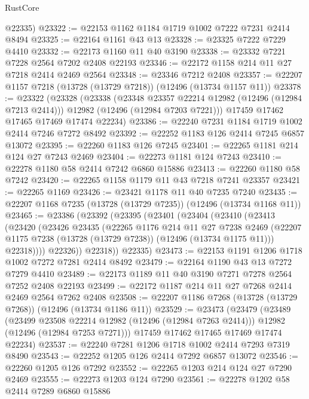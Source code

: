 \begin{lexlean}{RustCore}
\begin{coremodule}
      @22335)
@23322 := @22153 @1162 @1184 @1719 @1002 @7222 @7231 @2414 @8494
@23325 := @22164 @1161 @43 @13
@23328 := @23325 @7222 @7229 @4410
@23332 := @22173 @1160 @11 @40 @3190
@23338 := @23332 @7221 @7228 @2564 @7202 @2408 @22193
@23346 := @22172 @1158 @214 @11 @27 @7218 @2414 @2469 @2564
@23348 := @23346 @7212 @2408
@23357 := @22207 @1157 @7218 (@13728 (@13729 @7218)) (@12496 (@13734 @1157 @11))
@23378 := @23322
    (@23328
      (@23338
        (@23348 @23357 @22214 @12982 (@12496 (@12984 @7213 @2414)))
        @12982
        (@12496 (@12984 @7203 @7221)))
      @17459
      @17462
      @17465
      @17469
      @17474
      @22234)
@23386 := @22240 @7231 @1184 @1719 @1002 @2414 @7246 @7272 @8492
@23392 := @22252 @1183 @126 @2414 @7245 @6857 @13072
@23395 := @22260 @1183 @126 @7245
@23401 := @22265 @1181 @214 @124 @27 @7243 @2469
@23404 := @22273 @1181 @124 @7243
@23410 := @22278 @1180 @58 @2414 @7242 @6860 @15886
@23413 := @22260 @1180 @58 @7242
@23420 := @22265 @1158 @1179 @11 @43 @7218 @7241 @23357
@23421 := @22265 @1169
@23426 := @23421 @1178 @11 @40 @7235 @7240
@23435 := @22207 @1168 @7235 (@13728 (@13729 @7235)) (@12496 (@13734 @1168 @11))
@23465 := @23386
    (@23392
      (@23395
        (@23401
          (@23404
            (@23410
              (@23413
                (@23420
                  (@23426
                    @23435
                    (@22265
                      @1176
                      @214
                      @11
                      @27
                      @7238
                      @2469
                      (@22207 @1175 @7238 (@13728 (@13729 @7238)) (@12496 (@13734 @1175 @11)))
                      @22318))))
              @22326))
          @22318))
      @22335)
@23473 := @22153 @1191 @1206 @1718 @1002 @7272 @7281 @2414 @8492
@23479 := @22164 @1190 @43 @13 @7272 @7279 @4410
@23489 := @22173 @1189 @11 @40 @3190 @7271 @7278 @2564 @7252 @2408 @22193
@23499 := @22172 @1187 @214 @11 @27 @7268 @2414 @2469 @2564 @7262 @2408
@23508 := @22207 @1186 @7268 (@13728 (@13729 @7268)) (@12496 (@13734 @1186 @11))
@23529 := @23473
    (@23479
      (@23489
        (@23499 @23508 @22214 @12982 (@12496 (@12984 @7263 @2414)))
        @12982
        (@12496 (@12984 @7253 @7271)))
      @17459
      @17462
      @17465
      @17469
      @17474
      @22234)
@23537 := @22240 @7281 @1206 @1718 @1002 @2414 @7293 @7319 @8490
@23543 := @22252 @1205 @126 @2414 @7292 @6857 @13072
@23546 := @22260 @1205 @126 @7292
@23552 := @22265 @1203 @214 @124 @27 @7290 @2469
@23555 := @22273 @1203 @124 @7290
@23561 := @22278 @1202 @58 @2414 @7289 @6860 @15886

\end{coremodule}
\end{lexlean}
